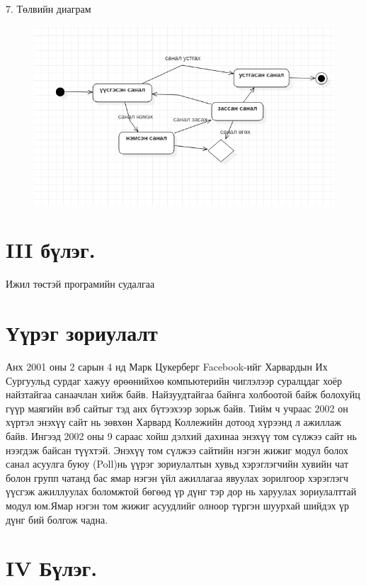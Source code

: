 \documentclass[12pt]{article}
\begin{document}
         7. Төлвийн диаграм

     \begin{figure}
    	\centering
	    \includegraphics[width=0.7\linewidth]{./Tolowo}
	    \caption{}
	    \label{fig:Tolowo}
     \end{figure}


	
	\section     {III бүлэг.} Ижил төстэй програмийн судалгаа
	
	\section	 {Үүрэг зориулалт}
	
	Анх 2001 оны 2 сарын 4 нд Марк Цукерберг Facebook-ийг Харвардын Их Сургуульд сурдаг хажуу өрөөнийхөө компьютерийн чиглэлээр суралцдаг хоёр найзтайгаа санаачлан хийж байв. Найзуудтайгаа байнга холбоотой байж болохуйц гүүр маягийн вэб сайтыг тэд анх бүтээхээр зорьж байв. Тийм ч учраас 2002 он хүртэл энэхүү сайт нь зөвхөн Харвард Коллежийн дотоод хүрээнд л ажиллаж байв. Ингээд 2002 оны 9 сараас хойш дэлхий дахинаа энэхүү том сүлжээ сайт нь нээгдэж байсан түүхтэй. Энэхүү том сүлжээ сайтийн нэгэн жижиг модул болох санал асуулга буюу (Poll)нь үүрэг зориулалтын хувьд хэрэглэгчийн хувийн чат болон групп чатанд бас ямар нэгэн үйл ажиллагаа явуулах зорилгоор хэрэглэгч үүсгэж ажиллуулах боломжтой бөгөөд үр дүнг тэр дор нь харуулах зориулалттай модул юм.Ямар нэгэн том жижиг асуудлийг олноор түргэн шуурхай шийдэх үр дүнг бий болгож чадна.  
	
	
	
	
	
	
	
	
	
		
	
	
	\section     {IV Бүлэг.} 
	
\end{document}

